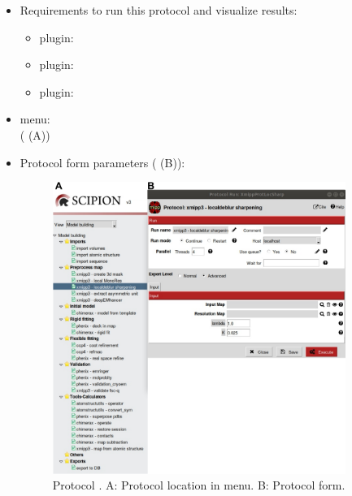 \begin{itemize}
 \item Requirements to run this protocol and visualize results:
    \begin{itemize}
        \item \scipion plugin: 
        \item \scipion plugin: 
        \item \scipion plugin: 
    \end{itemize}
 \item \scipion menu:\\
   ( (A))
  
 \item Protocol form parameters ( (B)):
  
    \begin{figure}[H]
     \centering 
     \captionsetup{width=.9\linewidth} 
     \includegraphics[width=0.90\textwidth]{Images_appendix/Fig208}
     \caption{Protocol . A: Protocol location in \scipion menu. B: Protocol form.}
     \label{fig:app_localdeblur_1}
    \end{figure}
    

\end{itemize}
